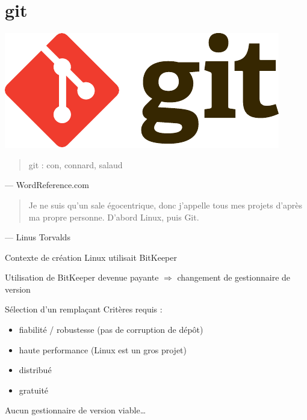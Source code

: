 \section{git}

\begin{frame}
\begin{center}\includegraphics{git-logo.pdf}\end{center}
\end{frame}

\begin{frame}
\begin{quote}git : con, connard, salaud\end{quote}
\begin{flushright}--- WordReference.com\end{flushright}

\begin{quote}Je ne suis qu'un sale égocentrique, donc j'appelle tous mes projets d'après ma propre personne. D'abord Linux, puis Git.\end{quote}
\begin{flushright}--- Linus Torvalds\end{flushright}
\end{frame}

\begin{frame}{Contexte de création}
Linux utilisait BitKeeper

Utilisation de BitKeeper devenue payante $\Rightarrow$ changement de gestionnaire de version
\end{frame}

\begin{frame}{Sélection d'un remplaçant}
Critères requis :
\begin{itemize}
\item fiabilité / robustesse (pas de corruption de dépôt)
\item haute performance (Linux est un gros projet)
\item distribué
\item gratuité
\end{itemize}

Aucun gestionnaire de version viable…
\end{frame}

